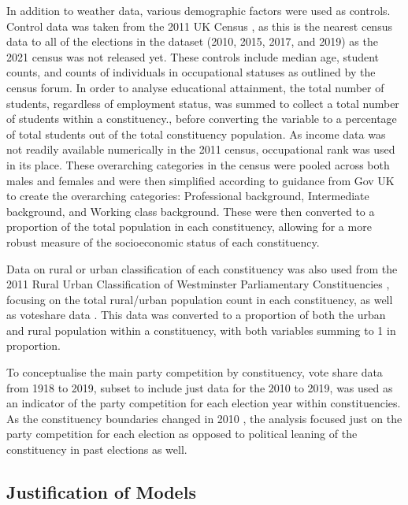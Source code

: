 \documentclass[preprint,12pt,authoryear]{elsarticle}
\begin{document}
In addition to weather data, various demographic factors were used as controls. Control data was taken from the 2011 UK Census \citep{2011CensusOffice}, as this is the nearest census data to all of the elections in the dataset (2010, 2015, 2017, and 2019) as the 2021 census was not released yet. These controls include median age, student counts, and counts of individuals in occupational statuses as outlined by the census forum. In order to analyse educational attainment, the total number of students, regardless of employment status, was summed to collect a total number of students within a constituency., before converting the variable to a percentage of total students out of the total constituency population. As income data was not readily available numerically in the 2011 census, occupational rank was used in its place. These overarching categories in the census were pooled across both males and females and were then simplified according to guidance from Gov UK \citep{SimplifyingHowEmployers} to create the overarching categories: Professional background, Intermediate background, and Working class background. These were then converted to a proportion of the total population in each constituency, allowing for a more robust measure of the socioeconomic status of each constituency. 

Data on rural or urban classification of each constituency was also used from the 2011 Rural Urban Classification of Westminster Parliamentary Constituencies \citep{RuralUrbanClassification}, focusing on the total rural/urban population count in each constituency, as well as voteshare data \citep{watsonGeneralElectionResults2024}. This data was converted to a proportion of both the urban and rural population within a constituency, with both variables summing to 1 in proportion.

To conceptualise the main party competition by constituency, vote share data from 1918 to 2019, subset to include just data for the 2010 to 2019, was used as an indicator of the party competition for each election year within constituencies. As the constituency boundaries changed in 2010 \citep{cracknell2010GeneralElection2024}, the analysis focused just on the party competition for each election as opposed to political leaning of the constituency in past elections as well. 

\subsection{Justification of Models}
\end{document}
